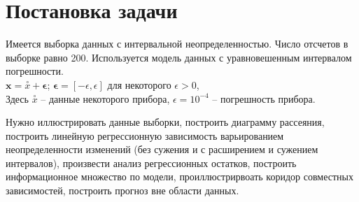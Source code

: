 \section{Постановка задачи}

Имеется выборка данных с интервальной неопределенностью. Число отсчетов в выборке равно 200. Используется модель данных с  уравновешенным интервалом погрешности. \\

$\bm{x} = \stackrel{\circ}{x} + \bm{\epsilon}$; \quad $\bm{\epsilon} = [-\epsilon, \epsilon]$  для некоторого $\epsilon >0 $, \\

Здесь $\stackrel{\circ}{x}$ -- данные некоторого прибора, $\epsilon = 10 ^ {-4}$ -- погрешность прибора.

Нужно иллюстрировать данные выборки, построить диаграмму рассеяния, построить линейную регрессионную зависимость варьированием неопределенности изменений (без сужения и с расширением и сужением интервалов),  произвести анализ регрессионных остатков, построить информационное множество по модели, проиллюстрирвоать коридор совместных зависимостей, построить прогноз вне области данных. 

